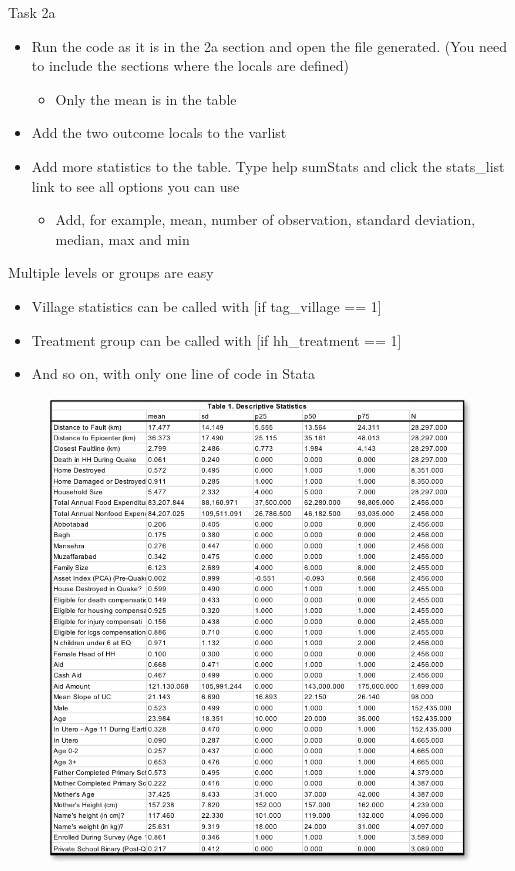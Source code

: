 \documentclass[aspectratio=169]{beamer}
\begin{document}
\begin{frame}{Task 2a}
\begin{itemize}
	\item Run the code as it is in the 2a section and open the file generated. (You need to include the sections where the locals are defined)
		\begin{itemize}
			\item Only the mean is in the table
		\end{itemize}
	\item Add the two outcome locals to the varlist
	\item Add more statistics to the table. Type help sumStats and click the stats\_list link to see all options you can use
		\begin{itemize}
			\item Add, for example, mean, number of observation, standard deviation, median, max and min
		\end{itemize}
\end{itemize}
\end{frame}

\begin{frame}[fragile]{Multiple levels or groups are easy}
\begin{multicols}{2}	
	\begin{itemize}
		\item Village statistics can be called with [if tag\_village == 1]
		\item Treatment group can be called with [if hh\_treatment == 1]
		\item And so on, with only one line of code in Stata
	\end{itemize}
		\begin{figure}
			\centering
			\includegraphics[width=\linewidth]{img/table1}
		\end{figure}
\end{multicols}
\end{frame}
\end{document}
